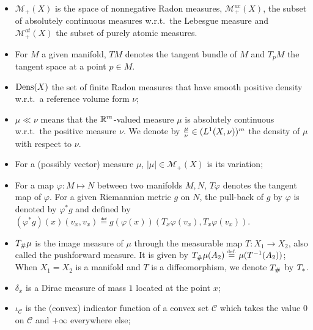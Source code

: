 \begin{itemize}
	\item $\mathcal{M}_+(X)$ is the space of nonnegative Radon measures,  $\mathcal{M}_+^{ac}(X)$, the subset of absolutely continuous measures w.r.t.\ the Lebesgue measure and $\mathcal{M}_+^{at}(X)$ the subset of purely atomic measures.
	\item For $M$ a given manifold, $TM$ denotes the tangent bundle of $M$ and $T_pM$ the tangent space at a point $p \in M$.
	\item $\operatorname{Dens}(X)$ the set of finite Radon measures that have smooth positive density w.r.t.\ a reference volume form $\nu$;

	\item $\mu \ll \nu$ means that the $\mathbb{R}^m$-valued measure $\mu$ is absolutely continuous w.r.t.\ the positive measure $\nu$. We denote by $\textstyle{\frac{\mu}{\nu}} \in (L^1(X,\nu))^m$ the density of $\mu$ with respect to $\nu$.

	\item For a (possibly vector) measure $\mu$, $|\mu| \in \mathcal{M}_+(X)$ is its variation;

	\item For a map $\varphi: M \mapsto N$ between two manifolds $M,N$, $T\varphi$ denotes the tangent map of $\varphi$. For a given Riemannian metric $g$ on $N$, 
	the pull-back of $g$ by $\varphi$ is denoted by $\varphi^*g$ and defined by $(\varphi^*g)(x)(v_x,v_x) \eqdef g(\varphi(x))(T_x\varphi(v_x),T_x\varphi(v_x))$.
	\item $T_{\#} \mu$ is the image measure of $\mu$ through the measurable map $T: X_1 \to X_2$, also called the pushforward measure. It is given by $T_{\#} \mu (A_2) \stackrel{\mbox{\upshape\tiny def.}}{=} \mu(T^{-1}(A_2))$; When $X_1= X_2$ is a manifold and $T$ is a diffeomorphism, we denote $T_{\#}$ by $T_{*}$.

	\item $\delta_x$ is a Dirac measure of mass $1$ located at the point $x$;

	\item $\iota_{\mathcal{C}}$ is the (convex) indicator function of a convex set $\mathcal{C}$ which takes the value $0$ on $\mathcal{C}$ and $+\infty$ everywhere else;


\end{itemize}

